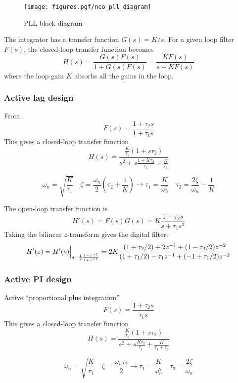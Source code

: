 \begin{figure}
\centering
  \texttt{[image: figures.pgf/nco\_pll\_diagram]}
\caption{PLL block diagram}
\label{fig:module:nco:pll_diagram}
\end{figure}


The integrator has a transfer function $G(s) = K/s$.
For a given loop filter $F(s)$, the closed-loop transfer function becomes
\[
    H(s) = \frac{ G(s)F(s) }{ 1 + G(s)F(s) }
         = \frac{ KF(s)    }{ s + KF(s)    }
\]
where the loop gain $K$ absorbs all the gains in the loop.

\subsubsection{Active lag design}
From \cite{Best:1997}.
\[
    F(s) = \frac{1 + \tau_2 s}{1 + \tau_1 s}
\]
This gives a closed-loop transfer function
\[
    H(s) = \frac{
                \frac{K}{\tau_1} (1 + s\tau_2)
           } {
                s^2 + s\frac{1 + K\tau_2}{\tau_1} + \frac{K}{\tau_1}
           }
\]

\[
    \omega_n = \sqrt{\frac{K}{\tau_1}}
    \,\,\,\,\,\,
    \zeta = \frac{\omega_n}{2}\left(\tau_2 + \frac{1}{K}\right)
        \rightarrow
    \tau_1 = \frac{K}{\omega_n^2}
    \,\,\,\,\,\,
    \tau_2 = \frac{2\zeta}{\omega_n} - \frac{1}{K}
\]

The open-loop transfer function is
\[
    H'(s) = F(s)G(s) = K \frac{1 + \tau_2 s}{s + \tau_1 s^2}
\]
Taking the bilinear $z$-transform gives the digital filter:
\[
    H'(z) = H'(s)\Bigl.\Bigr|_{s = \frac{1}{2}\frac{1-z^{-1}}{1+z^{-1}}}
          = 2 K \frac{
                (1+\tau_2/2) + 2 z^{-1}     + ( 1 - \tau_2/2)z^{-2}
          } {
                (1+\tau_1/2) -\tau_1 z^{-1} + (-1 + \tau_1/2)z^{-2}
          }
\]



\subsubsection{Active PI design}
Active ``proportional plus integration''
\[
    F(s) = \frac{1 + \tau_2 s}{\tau_1 s}
\]
This gives a closed-loop transfer function
\[
    H(s) = \frac{
                \frac{K}{\tau_1} (1 + s\tau_2)
           } {
                s^2 + s\frac{K\tau_2}{\tau_1} + \frac{K}{\tau_1 + \tau_2}
           }
\]

\[
    \omega_n = \sqrt{\frac{K}{\tau_1}}
    \,\,\,\,\,\,
    \zeta = \frac{\omega_n \tau_2}{2}
        \rightarrow
    \tau_1 = \frac{K}{\omega_n^2}
    \,\,\,\,\,\,
    \tau_2 = \frac{2\zeta}{\omega_n}
\]

